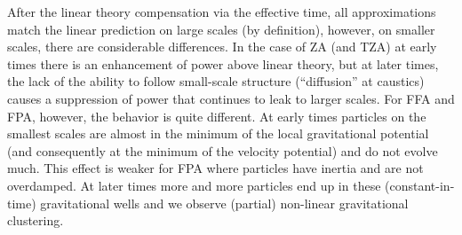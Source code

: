 After the linear theory compensation via the effective time, all approximations match the linear prediction on large scales (by definition), however, on smaller scales, there are considerable differences. In the case of ZA (and TZA) at early times there is an enhancement of power above linear theory, but at later times, the lack of the ability to follow small-scale structure (``diffusion'' at caustics) causes a suppression of power that continues to leak to larger scales. For FFA and FPA, however, the behavior is quite different. At early times particles on the smallest scales are almost in the minimum of the local gravitational potential (and consequently at the minimum of the velocity potential) and do not evolve much. This effect is weaker for FPA where particles have inertia and are not overdamped. At later times more and more particles end up in these (constant-in-time) gravitational wells and we observe (partial) non-linear gravitational clustering.
